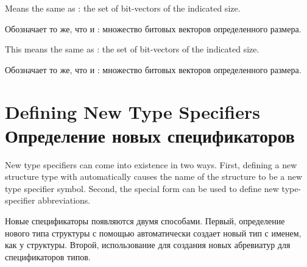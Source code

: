 \begin{flushdesc}
\item[\cd{(bit-vector \textit{size})}]
Means the same as :
the set of bit-vectors of the indicated size.

\item[\cd{(bit-vector \textit{размер})}]
Обозначает то же, что и : множество битовых
векторов определенного размера.

\item[\cd{(simple-bit-vector \textit{size})}]
This means the same as
: the set of bit-vectors of
the indicated size.

\item[\cd{(simple-bit-vector \textit{размер})}]
Обозначает то же, что и : множество битовых
векторов определенного размера.
\end{flushdesc}

\section{Defining New Type Specifiers Определение новых спецификаторов}

New type specifiers can come into existence in two ways.
First, defining a new structure type with  automatically
causes the name of the structure to be a new type specifier symbol.
Second, the  special form can be used to define new type-specifier
abbreviations.

Новые спецификаторы появляются двумя способами.
Первый, определение нового типа структуры с помощью  автоматически
создает новый тип с именем, как у структуры.
Второй, использование  для создания новых абревиатур для
спецификаторов типов.

